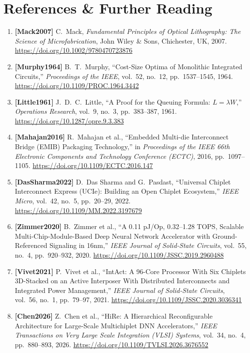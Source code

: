\section{References \& Further Reading}
\label{sec:ch9_references}

\begin{enumerate}
    \item \textbf{[Mack2007]} C.~Mack, \emph{Fundamental Principles of Optical Lithography: The Science of Microfabrication}, John Wiley \& Sons, Chichester, UK, 2007. \url{https://doi.org/10.1002/9780470723876}
    \item \textbf{[Murphy1964]} B.~T.~Murphy, ``Cost-Size Optima of Monolithic Integrated Circuits,'' \emph{Proceedings of the IEEE}, vol.~52, no.~12, pp.~1537--1545, 1964. \url{https://doi.org/10.1109/PROC.1964.3442}
    \item \textbf{[Little1961]} J.~D.~C.~Little, ``A Proof for the Queuing Formula: $L = \lambda W$,'' \emph{Operations Research}, vol.~9, no.~3, pp.~383--387, 1961. \url{https://doi.org/10.1287/opre.9.3.383}
    \item \textbf{[Mahajan2016]} R.~Mahajan et al., ``Embedded Multi-die Interconnect Bridge (EMIB) Packaging Technology,'' in \emph{Proceedings of the IEEE 66th Electronic Components and Technology Conference (ECTC)}, 2016, pp.~1097--1105. \url{https://doi.org/10.1109/ECTC.2016.147}
    \item \textbf{[DasSharma2022]} D.~Das Sharma and G.~Pasdast, ``Universal Chiplet Interconnect Express (UCIe): Building an Open Chiplet Ecosystem,'' \emph{IEEE Micro}, vol.~42, no.~5, pp.~20--29, 2022. \url{https://doi.org/10.1109/MM.2022.3197679}
    \item \textbf{[Zimmer2020]} B.~Zimmer et al., ``A 0.11 pJ/Op, 0.32--1.28 TOPS, Scalable Multi-Chip-Module-Based Deep Neural Network Accelerator with Ground-Referenced Signaling in 16nm,'' \emph{IEEE Journal of Solid-State Circuits}, vol.~55, no.~4, pp.~920--932, 2020. \url{https://doi.org/10.1109/JSSC.2019.2960488}
    \item \textbf{[Vivet2021]} P.~Vivet et al., ``IntAct: A 96-Core Processor With Six Chiplets 3D-Stacked on an Active Interposer With Distributed Interconnects and Integrated Power Management,'' \emph{IEEE Journal of Solid-State Circuits}, vol.~56, no.~1, pp.~79--97, 2021. \url{https://doi.org/10.1109/JSSC.2020.3036341}
    \item \textbf{[Chen2026]} Z.~Chen et al., ``HiRe: A Hierarchical Reconfigurable Architecture for Large-Scale Multichiplet DNN Accelerators,'' \emph{IEEE Transactions on Very Large Scale Integration (VLSI) Systems}, vol.~34, no.~4, pp.~880--893, 2026. \url{https://doi.org/10.1109/TVLSI.2026.3676552}

\end{enumerate}
